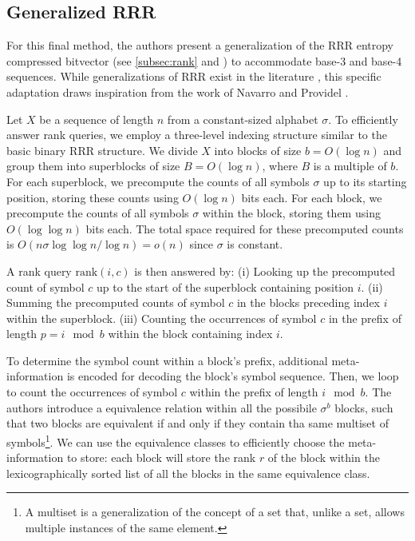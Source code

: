 \subsection{Generalized RRR}

For this final method, the authors present a generalization of the RRR entropy compressed bitvector (see \autoref{subsec:rank} and \cite{RRR2002}) to accommodate base-3 and base-4 sequences. While generalizations of RRR exist in the literature \cite{ferragina2007compressed}, this specific adaptation draws inspiration from the work of Navarro and Providel \cite{navarro2012fast}. \vspace{0.4cm}

\noindent Let \(X\) be a sequence of length \(n\) from a constant-sized alphabet \(\sigma\). To efficiently answer rank queries, we employ a three-level indexing structure similar to the basic binary RRR structure. We divide \(X\) into blocks of size \(b = O(\log n)\) and group them into superblocks of size \(B = O(\log n)\), where \(B\) is a multiple of \(b\). For each superblock, we precompute the counts of all symbols \(\sigma\) up to its starting position, storing these counts using \(O(\log n)\) bits each. For each block, we precompute the counts of all symbols \(\sigma\) within the block, storing them using \(O(\log \log n)\) bits each. The total space required for these precomputed counts is \(O(n \sigma \log \log n / \log n) = o(n)\) since \(\sigma\) is constant. \vspace{0.4cm}

\noindent A rank query \(\textrm{rank}(i, c)\) is then answered by: (i) Looking up the precomputed count of symbol \(c\) up to the start of the superblock containing position \(i\). (ii) Summing the precomputed counts of symbol \(c\) in the blocks preceding index \(i\) within the superblock. (iii) Counting the occurrences of symbol \(c\) in the prefix of length \(p = i \mod b\) within the block containing index \(i\). \vspace{0.4cm}


\noindent To determine the symbol count within a block's prefix, additional meta-information is encoded for decoding the block's symbol sequence. Then, we loop to count the occurrences of symbol \(c\) within the prefix of length $i \mod b$. The authors introduce a equivalence relation within all the possibile $\sigma^b$ blocks, such that two blocks are equivalent if and only if they contain tha same multiset of symbols\footnote{A multiset is a generalization of the concept of a set that, unlike a set, allows multiple instances of the same element.}. We can use the equivalence classes to efficiently choose the meta-information to store: each block will store the rank $r$ of the block within the lexicographically sorted list of all the blocks in the same equivalence class.

